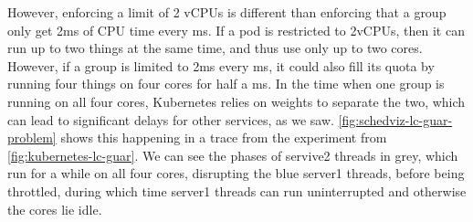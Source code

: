 However, enforcing a limit of 2 vCPUs is different than enforcing that a group
only get 2ms of CPU time every ms. If a pod is restricted to 2vCPUs, then it can
run up to two things at the same time, and thus use only up to two cores.
However, if a group is limited to 2ms every ms, it could also fill its quota by
running four things on four cores for half a ms. In the time when one group is
running on all four cores, Kubernetes relies on weights to separate the two,
which can lead to significant delays for other services, as we saw.
\autoref{fig:schedviz-lc-guar-problem} shows this happening in a trace from the
experiment from \autoref{fig:kubernetes-lc-guar}. We can see the phases of
servive2 threads in grey, which run for a while on all four cores, disrupting
the blue server1 threads, before being throttled, during which time server1
threads can run uninterrupted and otherwise the cores lie idle.









